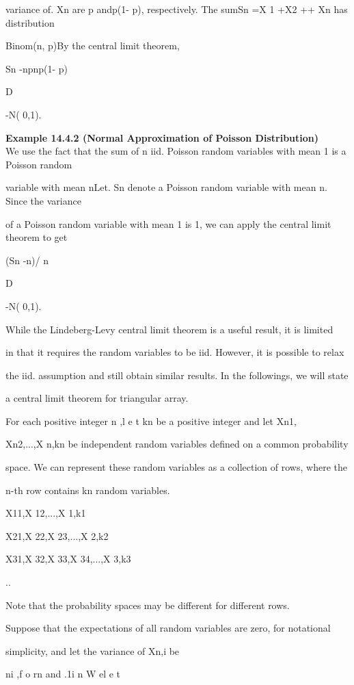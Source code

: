 variance of. Xn are p andp(1- p), respectively. The sumSn =X 1 +X2 +\cdot\cdot\cdot+ Xn has distribution

Binom(n, p)By the central limit theorem,

Sn -np\sqrt np(1- p)

D

-\to N( 0,1).

\textbf{Example 14.4.2 (Normal Approximation of Poisson Distribution)} \\

We use the fact that the sum of n iid. Poisson random variables with mean 1 is a Poisson random

variable with mean nLet. Sn denote a Poisson random variable with mean n. Since the variance

of a Poisson random variable with mean 1 is 1, we can apply the central limit theorem to get

(Sn -n)/ \sqrt n

D

-\to N( 0,1).

While the Lindeberg-Levy central limit theorem is a useful result, it is limited

in that it requires the random variables to be iid. However, it is possible to relax

the iid. assumption and still obtain similar results. In the followings, we will state

a central limit theorem for triangular array.

For each positive integer n ,l e t kn be a positive integer and let Xn1,

Xn2,...,X n,kn be independent random variables defined on a common probability

space. We can represent these random variables as a collection of rows, where the

n-th row contains kn random variables.

X11,X 12,...,X 1,k1

X21,X 22,X 23,...,X 2,k2

X31,X 32,X 33,X 34,...,X 3,k3

..

Note that the probability spaces may be different for different rows.

Suppose that the expectations of all random variables are zero, for notational

simplicity, and let the variance of Xn,i be 

ni ,f o rn and .1\leq i \leq n W el e t

